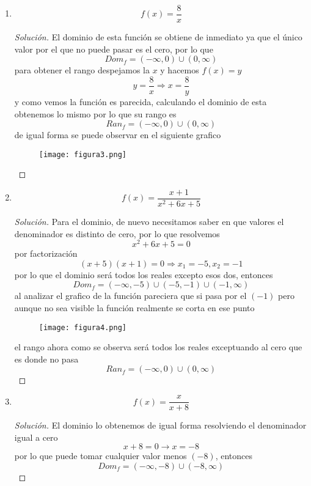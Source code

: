 \documentclass[12pt]{article}
\newenvironment{solution}{\begin{proof}[Solución]}{\end{proof}}
\begin{document}
\begin{enumerate}
\begin{solution}
    \end{solution}
    \item \[f(x) = \frac{8}{x}\]\begin{solution}
        El dominio de esta función se obtiene de inmediato ya que el único valor por el que no puede pasar es el cero, por lo que
        \[Dom_f = (-\infty,0) \cup (0, \infty)\]
        para obtener el rango despejamos la $x$ y hacemos $f(x) = y$
        \[y = \frac{8}{x} \Rightarrow x = \frac{8}{y}\]
        y como vemos la función es parecida, calculando el dominio de esta obtenemos lo mismo por lo que su rango es
        \[Ran_f = (-\infty,0) \cup (0, \infty)\]
        de igual forma se puede observar en el siguiente grafico
        \begin{figure}[H]
            \centering
            \texttt{[image: figura3.png]}
        \end{figure}
    \end{solution}
    \item \[f(x) = \frac{x+1}{x^2+6x+5}\]\begin{solution}
        Para el dominio, de nuevo necesitamos saber en que valores el denominador es distinto de cero, por lo que resolvemos
        \[x^2+6x +5 = 0\] por factorización \[(x+5)(x+1) = 0 \Rightarrow x_1 = -5, x_2 = -1\]
        por lo que el dominio será todos los reales excepto esos dos, entonces
        \[Dom_f = (-\infty, -5) \cup (-5,-1) \cup (-1, \infty)\]
        al analizar el grafico de la función pareciera que si pasa por el $(-1)$ pero aunque no sea visible la función realmente se corta en ese punto
        \begin{figure}[H]
            \centering
            \texttt{[image: figura4.png]}
        \end{figure}
        el rango ahora como se observa será todos los reales exceptuando al cero que es donde no pasa
        \[Ran_f = (-\infty, 0) \cup (0, \infty)\]
    \end{solution}
    \item \[f(x) = \frac{x}{x+8}\] \begin{solution}
        El dominio lo obtenemos de igual forma resolviendo el denominador igual a cero
        \[x+8 = 0 \rightarrow x = -8\]
        por lo que puede tomar cualquier valor menos $(-8)$, entonces
        \[Dom_f = (-\infty,-8)\cup (-8,\infty)\]
    \end{solution}
\end{enumerate}

\end{document}
